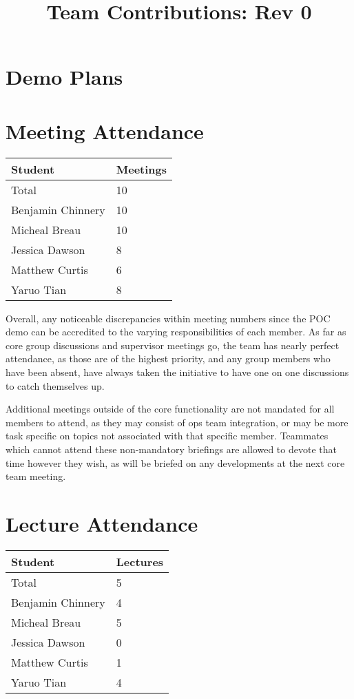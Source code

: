\documentclass{article}
\title{Team Contributions: Rev 0\\\progname}
\author{\authname}
\date{}
\begin{document}
\maketitle

\section{Demo Plans}


\section{Meeting Attendance}

\begin{table}[H]
\centering
\begin{tabular}{ll}
\toprule
\textbf{Student} & \textbf{Meetings}\\
\midrule
Total & 10\\
Benjamin Chinnery & 10\\
Micheal Breau & 10\\
Jessica Dawson & 8\\
Matthew Curtis & 6\\
Yaruo Tian & 8\\
\bottomrule
\end{tabular}
\end{table}
Overall, any noticeable discrepancies within meeting numbers since the POC demo can be accredited to the varying responsibilities of each member. As far as core group discussions and supervisor meetings go, the team has nearly perfect attendance, as those are of the highest priority, and any group members who have been absent, have always taken the initiative to have one on one discussions to catch themselves up.

Additional meetings outside of the core functionality are not mandated for all members to attend, as they may consist of ops team integration, or may be more task specific on topics not associated with that specific member. Teammates which cannot attend these non-mandatory briefings are allowed to devote that time however they wish, as will be briefed on any developments at the next core team meeting.


\section{Lecture Attendance}

\begin{table}[H]
\centering
\begin{tabular}{ll}
\toprule
\textbf{Student} & \textbf{Lectures}\\
\midrule
Total & 5\\
Benjamin Chinnery & 4\\
Micheal Breau & 5\\
Jessica Dawson & 0\\
Matthew Curtis & 1\\
Yaruo Tian & 4\\
\bottomrule
\end{tabular}
\end{table}
\end{document}

